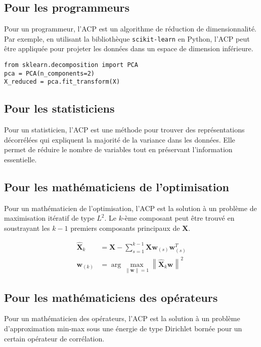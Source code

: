 \documentclass[12pt]{article}
\begin{document}
\subsection{Pour les programmeurs}

Pour un programmeur, l'ACP est un algorithme de réduction de dimensionnalité. Par exemple, en utilisant la bibliothèque \texttt{scikit-learn} en Python, l'ACP peut être appliquée pour projeter les données dans un espace de dimension inférieure.

\begin{lstlisting}
from sklearn.decomposition import PCA
pca = PCA(n_components=2)
X_reduced = pca.fit_transform(X)
\end{lstlisting}

\subsection{Pour les statisticiens}

Pour un statisticien, l'ACP est une méthode pour trouver des représentations décorrélées qui expliquent la majorité de la variance dans les données. Elle permet de réduire le nombre de variables tout en préservant l'information essentielle.

\subsection{Pour les mathématiciens de l'optimisation}

Pour un mathématicien de l'optimisation, l'ACP est la solution à un problème de maximisation itératif de type \( L^2 \). Le \( k \)-ème composant peut être trouvé en soustrayant les \( k-1 \) premiers composants principaux de \( \mathbf{X} \).

\begin{align}
\hat{\mathbf{X}}_k &= \mathbf{X} - \sum_{s=1}^{k-1} \mathbf{X} \mathbf{w}_{(s)} \mathbf{w}_{(s)}^T \\
\mathbf{w}_{(k)} &= \arg\max_{\|\mathbf{w}\|=1} \left\| \hat{\mathbf{X}}_k \mathbf{w} \right\|^2
\end{align}

\subsection{Pour les mathématiciens des opérateurs}

Pour un mathématicien des opérateurs, l'ACP est la solution à un problème d'approximation min-max sous une énergie de type Dirichlet bornée pour un certain opérateur de corrélation.
\end{document}
